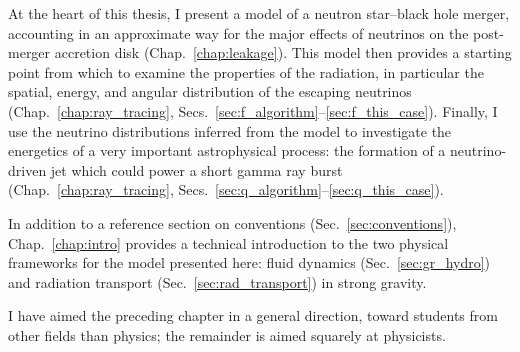 At the heart of this thesis, I present a model of a neutron star--black hole merger,
accounting in an approximate way for the major effects of neutrinos on the
post-merger accretion disk (Chap.~\ref{chap:leakage}).
This model then provides a starting point from which to examine the properties of
the radiation, in particular the spatial, energy, and angular distribution of the
escaping neutrinos
(Chap.~\ref{chap:ray_tracing}, Secs.~\ref{sec:f_algorithm}--\ref{sec:f_this_case}).
Finally, I use the neutrino distributions inferred from the model to investigate
the energetics of a very important astrophysical process: the formation of a
neutrino-driven jet which could power a short gamma ray burst
(Chap.~\ref{chap:ray_tracing}, Secs.~\ref{sec:q_algorithm}--\ref{sec:q_this_case}).

In addition to a reference section on conventions (Sec.~\ref{sec:conventions}),
Chap.~\ref{chap:intro} provides a technical introduction to the two physical
frameworks for the model presented here:
fluid dynamics (Sec.~\ref{sec:gr_hydro}) and
radiation transport (Sec.~\ref{sec:rad_transport})
in strong gravity.

I have aimed the preceding chapter in a general direction, toward students from
other fields than physics; the remainder is aimed squarely at physicists.
